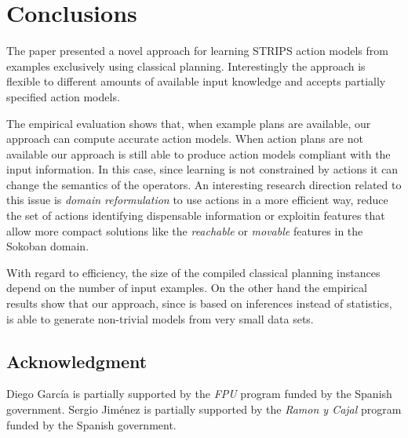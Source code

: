 \documentclass[letterpaper]{article} %
\begin{document}
\section{Conclusions}
The paper presented a novel approach for learning STRIPS action models from examples exclusively using classical planning. Interestingly the approach is flexible to different amounts of available input knowledge and accepts partially specified action models.   

The empirical evaluation shows that, when example plans are available, our approach can compute accurate action models. When action plans are not available our approach is still able to produce action models compliant with the input information. In this case, since learning is not constrained by actions it can change the semantics of the operators. An interesting research direction related to this issue is {\em domain reformulation} to use actions in a more efficient way, reduce the set of actions identifying dispensable information or exploitin features that allow more compact solutions like the {\em reachable} or {\em movable} features in the Sokoban domain. 

With regard to efficiency, the size of the compiled classical planning instances depend on the number of input examples. On the other hand the empirical results show that our approach, since is based on inferences instead of statistics, is able to generate non-trivial models from very small data sets.

\subsection*{Acknowledgment}
\begin{small}
Diego Garc\'ia is partially supported by the {\it FPU} program funded by the Spanish government. Sergio Jim\'enez is partially supported by the {\it Ramon y Cajal} program funded by the Spanish government.
\end{small}

\newpage



\end{document}

